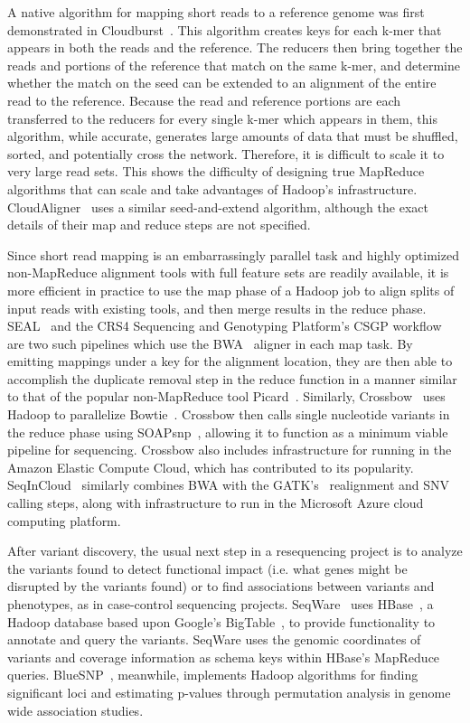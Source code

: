 A native algorithm for mapping short reads to a reference genome was first demonstrated in Cloudburst~\cite{Schatz:2009p278}. This algorithm creates keys for each k-mer that appears in both the reads and the reference. The reducers then bring together the reads and portions of the reference that match on the same k-mer, and determine whether the match on the seed can be extended to an alignment of the entire read to the reference. Because the read and reference portions are each transferred to the reducers for every single k-mer which appears in them, this algorithm, while accurate, generates large amounts of data that must be shuffled, sorted, and potentially cross the network. Therefore, it is difficult to scale it to very large read sets. This shows the difficulty of designing true MapReduce algorithms that can scale and take advantages of Hadoop's infrastructure. CloudAligner~\cite{Nguyen:2011p1832} uses a similar seed-and-extend algorithm, although the exact details of their map and reduce steps are not specified.

Since short read mapping is an embarrassingly parallel task and highly optimized non-MapReduce alignment tools with full feature sets are readily available, it is more efficient in practice to use the map phase of a Hadoop job to align splits of input reads with existing tools, and then merge results in the reduce phase. SEAL~\cite{Pireddu:2011fj} and the CRS4 Sequencing and Genotyping Platform's CSGP workflow~\cite{Pireddu:2011:MGS:1996092.1996106} are two such pipelines which use the BWA~\cite{Li:2009p836} aligner in each map task. By emitting mappings under a key for the alignment location, they are then able to accomplish the duplicate removal step in the reduce function in a manner similar to that of the popular non-MapReduce tool Picard~\cite{picard}. Similarly, Crossbow~\cite{Langmead:2009p1225} uses Hadoop to parallelize Bowtie~\cite{Langmead:2009p768}. Crossbow then calls single nucleotide variants in the reduce phase using SOAPsnp~\cite{Li:2009p1236}, allowing it to function as a minimum viable pipeline for sequencing. Crossbow also includes infrastructure for running in the Amazon Elastic Compute Cloud, which has contributed to its popularity. SeqInCloud~\cite{nabeel-bicob13-genome-analysis-cloud} similarly combines BWA with the GATK's~\cite{McKenna:2010p1051} realignment and SNV calling steps, along with infrastructure to run in the Microsoft Azure cloud computing platform.

After variant discovery, the usual next step in a resequencing project is to analyze the variants found to detect functional impact (i.e. what genes might be disrupted by the variants found) or to find associations between variants and phenotypes, as in case-control sequencing projects. SeqWare~\cite{Oconnor:2010p1835} uses HBase~\cite{hbase}, a Hadoop database based upon Google's BigTable~\cite{Chang:2008:BDS:1365815.1365816}, to provide functionality to annotate and query the variants. SeqWare uses the genomic coordinates of variants and coverage information as schema keys within HBase's MapReduce queries. BlueSNP~\cite{Huang:2012bb}, meanwhile, implements Hadoop algorithms for finding significant loci and estimating p-values through permutation analysis in genome wide association studies.

